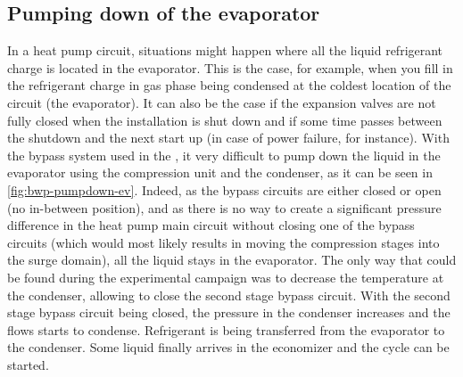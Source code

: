 \subsection{Pumping down of the evaporator}
\label{sec:pump-down-ev}

In a heat pump circuit, situations might happen where all the liquid
refrigerant charge is located in the evaporator. This is the case, for
example, when you fill in the refrigerant charge in gas phase being
condensed at the coldest location of the circuit (the evaporator). It
can also be the case if the expansion valves are not fully closed when
the installation is shut down and if some time passes between the
shutdown and the next start up (in case of power failure, for
instance). With the bypass system used in the \AWP{}, it very difficult to pump
down the liquid in the evaporator using the compression unit and the
condenser, as it can be seen in \cref{fig:bwp-pumpdown-ev}. Indeed, as
the bypass circuits are either closed or open (no in-between
position), and as there is no way to create a significant pressure
difference in the heat pump main circuit without closing one of the
bypass circuits (which would most likely results in moving the
compression stages into the surge domain), all the liquid stays in the
evaporator. The only way that could be found during the experimental
campaign was to decrease the temperature at the condenser, allowing to
close the second stage bypass circuit. With the second stage bypass
circuit being closed, the pressure in the condenser increases and the
flows starts to condense. Refrigerant is being transferred from the
evaporator to the condenser. Some liquid finally arrives in the
economizer and the cycle can be started.

